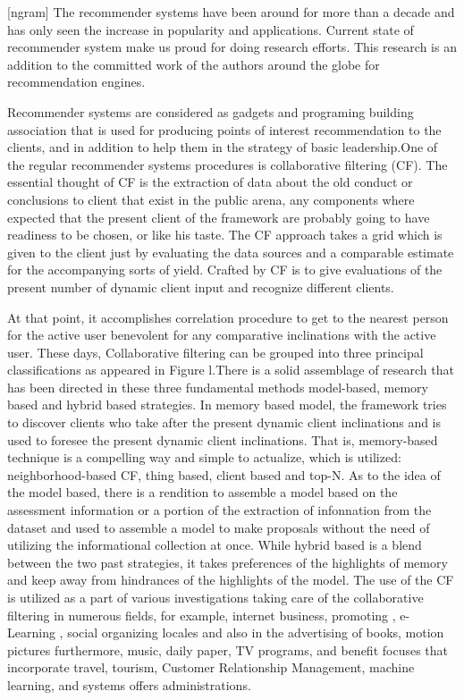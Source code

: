 \documentclass[10pt,conference]{IEEEtran}
\begin{document}
[ngram]
The recommender systems have been around for more than a decade and has only seen the increase in popularity and applications.
Current state of recommender system make us proud for doing research efforts. This research is an addition to the committed work of the authors around the globe for recommendation engines.

Recommender systems are considered as gadgets and programing building association that is used for producing points of interest recommendation to the clients, and in addition to help them in the strategy of basic leadership.One of the regular recommender systems procedures is collaborative filtering (CF). The essential thought of CF is the extraction of data about the old conduct or conclusions to client that exist in the public arena, any components where expected that the present client of the framework are probably going to have readiness to be chosen, or like his taste. The CF approach takes a grid which is given to the client just by evaluating the data sources and a comparable estimate for the accompanying sorts of yield. Crafted by CF is to give evaluations of the present number of dynamic client input and recognize different clients.

At that point, it accomplishes correlation procedure to get to the nearest person for the active user benevolent for any comparative inclinations with the active user. These days, Collaborative filtering can be grouped into three principal classifications as appeared in Figure l.There is a solid assemblage of research that has been directed in these three fundamental methods model-based, memory based and hybrid based strategies. In memory based model, the framework tries to discover clients who take after the present dynamic client inclinations and is used to foresee the present dynamic client inclinations. That is, memory-based technique is a compelling way and simple to actualize, which is utilized: neighborhood-based CF, thing based, client based and top-N. As to the idea of the model based, there is a rendition to assemble a model based on the assessment information or a portion of the extraction of infonnation from the dataset and used to assemble a model to make proposals without the need of utilizing the informational collection at once. While hybrid based is a blend between the two past strategies, it takes preferences of the highlights of memory and keep away from hindrances of the highlights of the model. The use of the CF is utilized as a part of various investigations taking care of the collaborative filtering in numerous fields, for example, internet business, promoting , e-Learning , social organizing locales and also in the advertising of books, motion pictures furthermore, music, daily paper, TV programs, and benefit focuses that incorporate travel, tourism, Customer Relationship Management, machine learning, and systems offers administrations.
\end{document}
